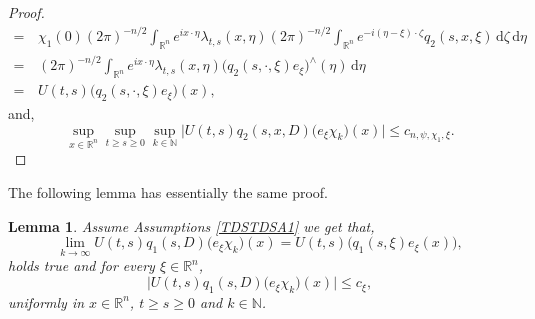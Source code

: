 \documentclass[a4paper, 12pt]{report}
\newtheorem{lemma}[theorem]{Lemma}
\theoremstyle{remark}
\theoremstyle{definition}
\begin{document}
\begin{proof}
$$\begin{aligned}
= & \, \chi_1(0)(2\pi)^{-n/2}\int_{\mathbb{R}^n}e^{ix\cdot\eta}\lambda_{t, s}(x, \eta)(2\pi)^{-n/2}\int_{\mathbb{R}^n}e^{-i(\eta - \xi)\cdot \zeta}q_2(s, x, \xi)\,\mathrm{d}\zeta\,\mathrm{d}\eta\\
= & \, (2\pi)^{-n/2}\int_{\mathbb{R}^n}e^{ix\cdot\eta}\lambda_{t, s}(x, \eta)\big(q_2(s, \cdot, \xi)e_\xi\big)^\wedge(\eta)\,\mathrm{d}\eta\\
= & \, U(t, s)\big(q_2(s, \cdot, \xi)e_\xi\big)(x),
\end{aligned}
$$
and,
$$
\sup_{x \in \mathbb{R}^n}\sup_{t \ge s \ge 0}\sup_{k \in \mathbb{N}}\big|U(t, s)q_2(s, x, D)\big(e_\xi\chi_k\big)(x)\big| \le c_{n, \psi, \chi_1, \xi}.
$$
\end{proof}

The following lemma has essentially the same proof.
\begin{lemma}\label{TDSSoAPL4}
Assume Assumptions \ref{TDSTDSA1} we get that,
$$
\lim_{k \to \infty}U(t, s)q_1(s, D)\big(e_\xi\chi_k\big)(x) = U(t, s)\big(q_1(s, \xi)e_\xi(x)\big),
$$
holds true and for every $\xi \in \mathbb{R}^n$,
$$
\big|U(t, s)q_1(s, D)\big(e_\xi\chi_k\big)(x)\big| \le c_\xi,
$$
uniformly in $x \in \mathbb{R}^n$, $t \ge s \ge 0$ and $k \in \mathbb{N}$.
\end{lemma}
\end{document}
